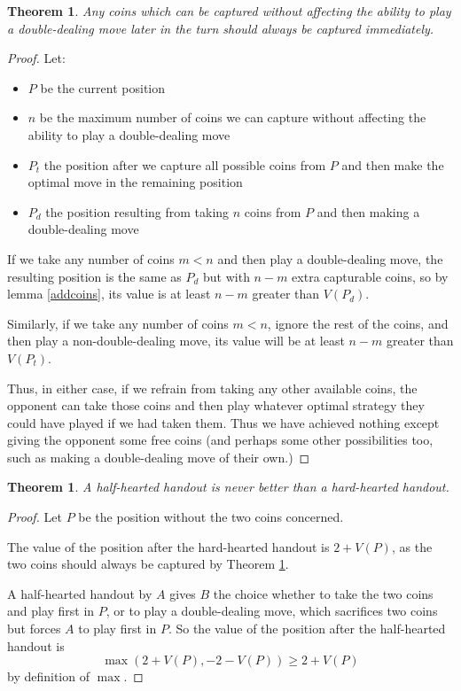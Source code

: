 \documentclass[a4paper,twocolumn]{article}
\newtheorem{freecoins}[thm]{Theorem}
\newtheorem{halfheartedbad}[thm]{Theorem}
\begin{document}
\begin{freecoins}\label{freecoins}
  Any coins which can be captured without affecting the ability to
  play a double-dealing move later in the turn should always be
  captured immediately.
\end{freecoins}
\begin{proof}
  Let:
  \begin{itemize}
    \item $P$ be the current position
    \item $n$ be the maximum number of coins we can capture without
      affecting the ability to play a double-dealing move
    \item $P_t$ the position after we capture all possible coins from
      $P$ and then make the optimal move in the remaining position
    \item $P_d$ the position resulting from taking $n$ coins from $P$
      and then making a double-dealing move
  \end{itemize}

  If we take any number of coins $m < n$ and then play a
  double-dealing move, the resulting position is the same as $P_d$ but
  with $n-m$ extra capturable coins, so by lemma \ref{addcoins}, its
  value is at least $n-m$ greater than $V(P_d)$.

  Similarly, if we take any number of coins $m < n$, ignore the rest
  of the coins, and then play a non-double-dealing move, its value
  will be at least $n-m$ greater than $V(P_t)$.

  Thus, in either case, if we refrain from taking any other available
  coins, the opponent can take those coins and then play whatever
  optimal strategy they could have played if we had taken them. Thus
  we have achieved nothing except giving the opponent some free coins
  (and perhaps some other possibilities too, such as making a
  double-dealing move of their own.)
\end{proof}

\begin{halfheartedbad}\label{halfheartedbad}
  A half-hearted handout is never better than a hard-hearted handout.
\end{halfheartedbad}
\begin{proof}
  Let $P$ be the position without the two coins concerned.

  The value of the position after the hard-hearted handout is
  $2+V(P)$, as the two coins should always be captured by Theorem
  \ref{freecoins}.

  A half-hearted handout by $A$ gives $B$ the choice whether to take
  the two coins and play first in $P$, or to play a double-dealing
  move, which sacrifices two coins but forces $A$ to play first in
  $P$. So the value of the position after the half-hearted handout
  is $$\max(2+V(P),-2-V(P)) \ge 2+V(P)$$ by definition of $\max$.
\end{proof}
\end{document}
